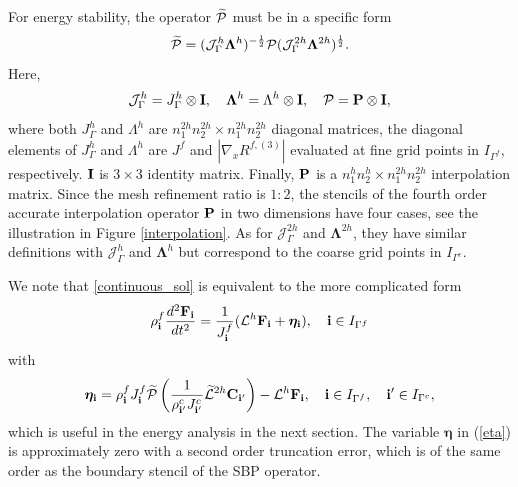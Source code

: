 For energy stability, the operator $ \widetilde{\mathcal{P}}$ must be in a specific form
\[\widetilde{\mathcal{P}} = (\mathcal{J}^h_\Gamma \bm{\Lambda}^h)^{-\frac{1}{2}}\mathcal{P}(\mathcal{J}^{2h}_\Gamma \bm{\Lambda}^{2h})^{\frac{1}{2}}.\]
Here, 
\[\mathcal{J}_{\Gamma}^h = J^{h}_{\Gamma} \otimes {\bf I},\quad {\bm{\Lambda}^h} = \Lambda^h\otimes {\bf I},\quad \mathcal{P} = {\bf P}\otimes {\bf I},\]
where both $J_{\Gamma}^h$ and $\Lambda^h$ are $n_1^{2h}n_2^{2h}\times n_1^{2h}n_2^{2h}$ diagonal matrices, the diagonal elements of $J_{\Gamma}^h$ and $\Lambda^{h}$ are $J^f$ and $|\nabla_x R^{f,(3)}|$ evaluated at fine grid points in $I_{\Gamma^f}$, respectively. ${\bf I}$ is $3\times 3$ identity matrix. Finally, ${\bf P}$ is a $n_1^hn_2^h\times n_1^{2h}n_2^{2h}$ interpolation matrix. Since the mesh refinement ratio is $1:2$, the stencils of the fourth order accurate interpolation operator ${\bf P}$ in two dimensions have four cases, see the illustration in  Figure \ref{interpolation}. As for $\mathcal{J}_{\Gamma}^{2h}$ and ${\bm{\Lambda}^{2h}}$, they have similar definitions with $\mathcal{J}_{\Gamma}^{h}$ and ${\bm{\Lambda}^{h}}$ but correspond to the coarse grid points in $I_{\Gamma^c}$.

We note that \eqref{continuous_sol} is equivalent to the more complicated form
\begin{equation}\label{elastic_semi_f_i}
{\rho}^f_{\bf i} \frac{d^2{\bf F}_{\bf i}}{dt^2} =
\frac{1}{J^f_{\bf i}}(\mathcal{L}^h{\bf F}_{\bf i} + {\bm \eta}_{\bf i}), \quad {\bf i}\in I_{\Gamma^f}
\end{equation}
with 
\begin{equation}\label{eta}
{\bm \eta}_{\bf i} = {\rho}^f_{\bf i}J^f_{\bf i}\wt{\mathcal{P}}\left(\frac{1}{\rho^c_{{\bf i}'}J^c_{{\bf i}'}}\wt{\mathcal{L}}^{2h} {\bf C}_{{\bf i}'}\right) - \mathcal{L}^{h}{\bf F}_{\bf i}, \quad {\bf i}\in I_{\Gamma^f},\quad {{\bf i}'}\in I_{\Gamma^c},
\end{equation}
which is useful in the energy analysis in the next section. The variable $\bm \eta$ in (\ref{eta}) is approximately zero with a second order truncation error, which is of the same order as the boundary stencil of the SBP operator. %

